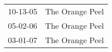 \begin{supertabular}{p{0.25\columnwidth}p{0.75\columnwidth}}
 10-13-05 &  The Orange Peel \\
 05-02-06 &  The Orange Peel \\
 03-01-07 &  The Orange Peel \\
\end{supertabular}
